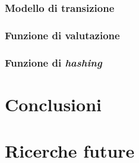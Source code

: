 \documentclass{article}
\begin{document}
\subsubsection{Modello di transizione}

\subsubsection{Funzione di valutazione}

\subsubsection{Funzione di \emph{hashing}}

\section{Conclusioni}

\section{Ricerche future}

\pagebreak

\begin{sloppypar}
\printbibliography[
  heading=bibintoc
]
\end{sloppypar}
\end{document}
